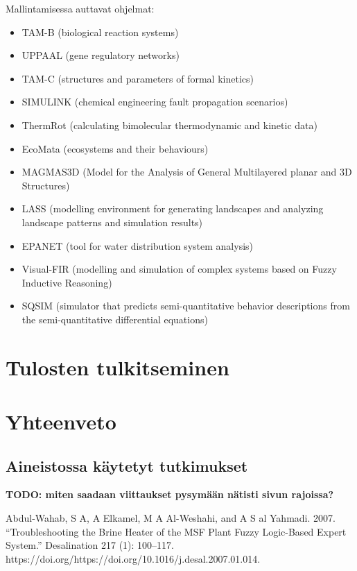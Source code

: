 \documentclass[utf8]{gradu3}
\begin{document}
Mallintamisessa auttavat ohjelmat:
\begin{itemize}
    \item TAM-B (biological reaction systems)
    \item UPPAAL (gene regulatory networks)
    \item TAM-C (structures and parameters of formal kinetics)
    \item SIMULINK (chemical engineering fault propagation scenarios)
    \item ThermRot (calculating bimolecular thermodynamic and kinetic data)
    \item EcoMata (ecosystems and their behaviours)
    \item MAGMAS3D (Model for the Analysis of General Multilayered planar and 3D Structures)
    \item LASS (modelling environment for generating landscapes and analyzing landscape patterns and simulation results)
    \item EPANET (tool for water distribution system analysis)
    \item Visual-FIR (modelling and simulation of complex systems based on Fuzzy Inductive Reasoning)
    \item SQSIM (simulator that predicts semi-quantitative behavior descriptions from the  semi-quantitative differential equations)
\end{itemize}



\chapter{Tulosten tulkitseminen}


\chapter{Yhteenveto}


\printbibliography

\appendix
\section{Aineistossa käytetyt tutkimukset}
\textbf{TODO: miten saadaan viittaukset pysymään nätisti sivun rajoissa?}

Abdul-Wahab, S A, A Elkamel, M A Al-Weshahi, and A S al Yahmadi. 2007. “Troubleshooting the Brine Heater of the MSF Plant Fuzzy Logic-Based Expert System.” Desalination 217 (1): 100–117. https://doi.org/https://doi.org/10.1016/j.desal.2007.01.014.
\end{document}

